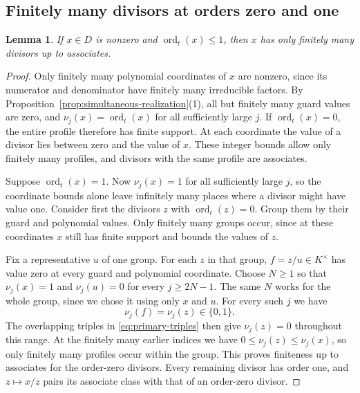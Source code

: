 \documentclass{article}
\DeclareMathOperator{\ord}{ord}
\newtheorem{lemma}[proposition]{Lemma}
\theoremstyle{remark}
\begin{document}
\subsection{Finitely many divisors at orders zero and one}

\begin{lemma}
    \label{lem:low-order-divisors}
    If $x \in D$ is nonzero and $\ord_t(x) \le 1$, then $x$ has only finitely many divisors up to associates.
\end{lemma}

\begin{proof}
    Only finitely many polynomial coordinates of $x$ are nonzero, since its numerator and denominator have finitely many irreducible factors.
    By Proposition~\ref{prop:simultaneous-realization}(1), all but finitely many guard values are zero, and $\nu_j(x) = \ord_t(x)$ for all sufficiently large $j$.
    If $\ord_t(x) = 0$, the entire profile therefore has finite support.
    At each coordinate the value of a divisor lies between zero and the value of $x$.
    These integer bounds allow only finitely many profiles, and divisors with the same profile are associates.

    Suppose $\ord_t(x) = 1$.
    Now $\nu_j(x) = 1$ for all sufficiently large $j$, so the coordinate bounds alone leave infinitely many places where a divisor might have value one.
    Consider first the divisors $z$ with $\ord_t(z) = 0$.
    Group them by their guard and polynomial values.
    Only finitely many groups occur, since at these coordinates $x$ still has finite support and bounds the values of $z$.

    Fix a representative $u$ of one group.
    For each $z$ in that group, $f = z/u \in K^\times$ has value zero at every guard and polynomial coordinate.
    Choose $N \ge 1$ so that $\nu_j(x) = 1$ and $\nu_j(u) = 0$ for every $j \ge 2N - 1$.
    The same $N$ works for the whole group, since we chose it using only $x$ and $u$.
    For every such $j$ we have
    \[
        \nu_j(f) = \nu_j(z) \in \{0, 1\}.
    \]
    The overlapping triples in \eqref{eq:primary-triples} then give $\nu_j(z) = 0$ throughout this range.
    At the finitely many earlier indices we have $0 \le \nu_j(z) \le \nu_j(x)$, so only finitely many profiles occur within the group.
    This proves finiteness up to associates for the order-zero divisors.
    Every remaining divisor has order one, and $z \mapsto x/z$ pairs its associate class with that of an order-zero divisor.
\end{proof}
\end{document}
